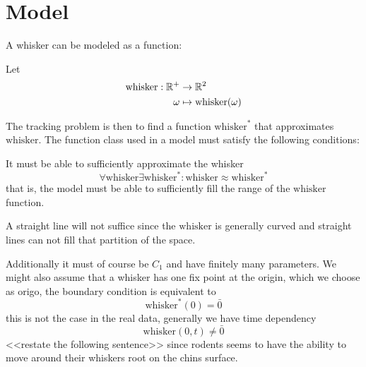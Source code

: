 \section{Model}


A whisker can be modeled as a function:



\begin{definition}
    Let 
    \begin{equation}
    \begin{split}
        \text{whisker} : \mathbb{R}^+ &\rightarrow \mathbb{R}^2 \\
                  \omega&\mapsto \text{whisker}(\omega)
    \end{split}
    \end{equation}
\end{definition}

The tracking problem is then to find a function $\text{whisker}^*$
that approximates $\text{whisker}$. The function class used in a model
must satisfy the following conditions:

It must be able to sufficiently approximate the whisker
\begin{equation}
    \forall \text{whisker} \exists \text{whisker}^* : \text{whisker} \approx \text{whisker}^*
\end{equation}
that is, the model must be able to sufficiently fill the range of the $\text{whisker}$ function.

\begin{example}
    A straight line will not suffice since the $\text{whisker}$ is generally
    curved and straight lines can not fill that partition of the space.
\end{example}

Additionally it must of course be $C_1$ and have finitely many parameters.
We might also assume that a whisker has one fix point at the origin, which we
choose as origo, the boundary condition is equivalent to
\begin{equation}
    \label{eq:bv_root}
    \text{whisker}^*(0)=\bar{0}
\end{equation}
this is not the case in the real data, generally we have time dependency
\begin{equation}
    \text{whisker}(0,t)\neq\bar{0} 
\end{equation}
<<restate the following sentence>>
since rodents seems to have the ability to move around their whiskers root on
the chins surface.

